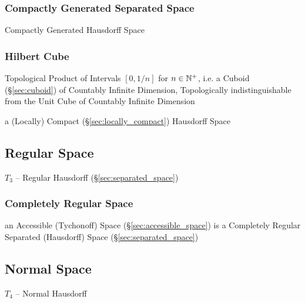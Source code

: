 \subsubsection{Compactly Generated Separated Space}\label{sec:compact_separated}

Compactly Generated Hausdorff Space



\subsubsection{Hilbert Cube}\label{sec:hilbert_cube}

Topological Product of Intervals $[0, 1/n]$ for $n \in \mathbb{N}^+$, i.e. a Cuboid
(\S\ref{sec:cuboid}) of Countably Infinite Dimension, Topologically
indistinguishable from the Unit Cube of Countably Infinite Dimension

a (Locally) Compact (\S\ref{sec:locally_compact}) Hausdorff Space



\subsection{Regular Space}\label{sec:regular_space}

$\xspace{T}_3$ -- Regular Hausdorff (\S\ref{sec:separated_space})



\subsubsection{Completely Regular Space}\label{sec:completely_regular_space}

an Accessible (Tychonoff) Space (\S\ref{sec:accessible_space}) is a Completely
Regular Separated (Hausdorff) Space (\S\ref{sec:separated_space})



\subsection{Normal Space}\label{sec:normal_space}

$\xspace{T}_4$ -- Normal Hausdorff

